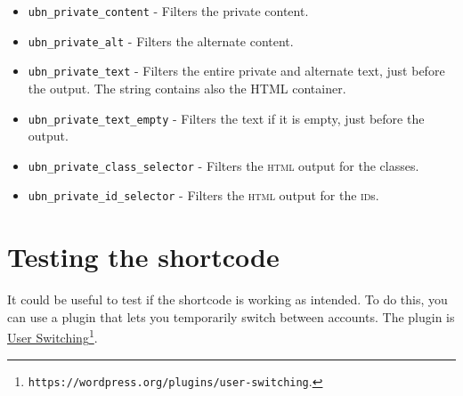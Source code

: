 \documentclass[a4paper,10pt]{article}
\begin{document}
\begin{itemize}
 \item \verb+ubn_private_content+ - Filters the private content.
 \item \verb+ubn_private_alt+ - Filters the alternate content.
 \item \verb+ubn_private_text+ - Filters the entire private and alternate text, just before the output. The string contains also the HTML container.
 \item \verb+ubn_private_text_empty+ - Filters the text if it is empty, just before the output.
 \item \verb+ubn_private_class_selector+ - Filters the \textsc{html} output for the classes.
 \item \verb+ubn_private_id_selector+ - Filters the \textsc{html} output for the \textsc{id}s.
\end{itemize}

\section{Testing the shortcode}

It could be useful to test if the shortcode is working as intended. To do this, you can use a plugin that lets you temporarily switch between accounts. The plugin is \href{https://wordpress.org/plugins/user-switching}{User Switching}\footnote{\texttt{https://wordpress.org/plugins/user-switching}.}.
\end{document}
